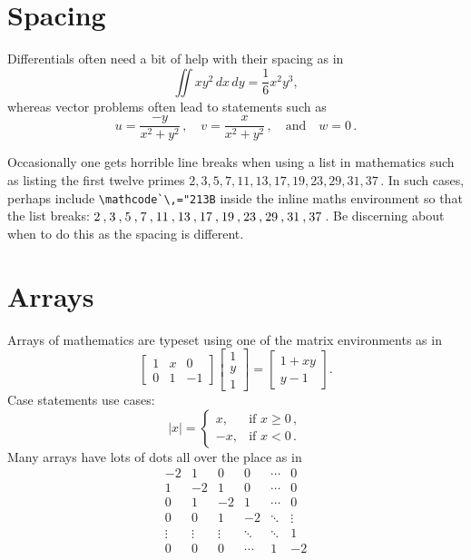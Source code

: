 \documentclass[a4paper]{article}
\begin{document}
    \section{Spacing}
    
    Differentials often need a bit of help with their spacing as in
    \[
        \iint xy^2\,dx\,dy 
        =\frac{1}{6}x^2y^3,
    \]
    whereas vector problems often lead to statements such as
    \[
        u=\frac{-y}{x^2+y^2}\,,\quad
        v=\frac{x}{x^2+y^2}\,,\quad\text{and}\quad
        w=0\,.
    \]

    Occasionally one gets horrible line breaks when using a list in mathematics such as 
    listing the first twelve primes  \(2,3,5,7,11,13,17,19,23,29,31,37\)\,.
    In such cases, perhaps include \verb|\mathcode`\,="213B| inside the inline maths environment so that the list breaks: \(\mathcode`\,="213B 2,3,5,7,11,13,17,19,23,29,31,37\)\,.
    Be discerning about when to do this as the spacing is different.
    
    
    
    
    
    
    \section{Arrays}
    
    Arrays of mathematics are typeset using one of the matrix environments as 
    in
    \[
        \begin{bmatrix}
            1 & x & 0 \\
            0 & 1 & -1
        \end{bmatrix}\begin{bmatrix}
            1  \\
            y  \\
            1
        \end{bmatrix}
        =\begin{bmatrix}
            1+xy  \\
            y-1
        \end{bmatrix}.
    \]
    Case statements use cases:
    \[
        |x|=\begin{cases}
            x, & \text{if }x\geq 0\,,  \\
            -x, & \text{if }x< 0\,.
        \end{cases}
    \]
    Many arrays have lots of dots all over the place as in
    \[
        \begin{matrix}
            -2 & 1 & 0 & 0 & \cdots & 0  \\
            1 & -2 & 1 & 0 & \cdots & 0  \\
            0 & 1 & -2 & 1 & \cdots & 0  \\
            0 & 0 & 1 & -2 & \ddots & \vdots \\
            \vdots & \vdots & \vdots & \ddots & \ddots & 1  \\
            0 & 0 & 0 & \cdots & 1 & -2
        \end{matrix}
    \]
    
\end{document}
